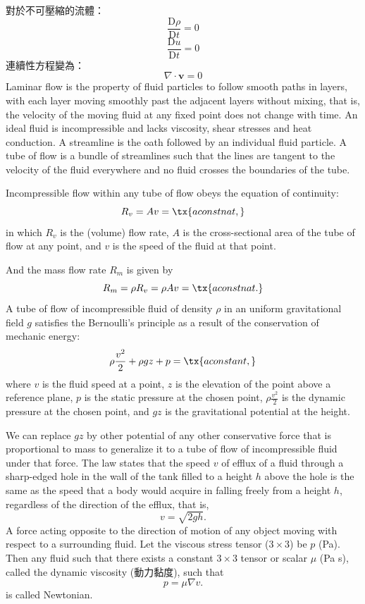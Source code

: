 \documentclass[a4paper,12pt]{article}
\begin{document}
對於不可壓縮的流體：
\[\frac{\mathrm{D}\rho}{\mathrm{D}t}=0\]
\[\frac{\mathrm{D}u}{\mathrm{D}t}=0\]
連續性方程變為：
\[\nabla\cdot\mathbf{v}=0\]
Laminar flow is the property of fluid particles to follow smooth paths in layers, with each layer moving smoothly past the adjacent layers without mixing, that is, the velocity of the moving fluid at any fixed point does not change with time.
An ideal fluid is incompressible and lacks viscosity, shear stresses and heat conduction.
A streamline is the oath followed by an individual fluid particle.
A tube of flow is a bundle of streamlines such that the lines are tangent to the velocity of the fluid everywhere and no fluid crosses the boundaries of the tube.

Incompressible flow within any tube of flow obeys the equation of continuity:
\[R_v=Av=\tx{a constnat,}\]
in which $R_v$ is the (volume) flow rate, $A$ is the cross-sectional area of the tube of flow at any point, and $v$ is the speed of the fluid at that point.

And the mass flow rate $R_m$ is given by
\[R_m=\rho R_v=\rho Av=\tx{a constnat.}\]
A tube of flow of incompressible fluid of density $\rho$ in an uniform gravitational field $g$ satisfies the Bernoulli's principle as a result of the conservation of mechanic energy:
\[\rho\frac{v^2}{2}+\rho gz+p=\tx{a constant,}\]
where $v$ is the fluid speed at a point, $z$ is the elevation of the point above a reference plane, $p$ is the static pressure at the chosen point, $\rho\frac{v^2}{2}$ is the dynamic pressure at the chosen point, and $gz$ is the gravitational potential at the height.

We can replace $gz$ by other potential of any other conservative force that is proportional to mass to generalize it to a tube of flow of incompressible fluid under that force.
The law states that the speed $v$ of efflux of a fluid through a sharp-edged hole in the wall of the tank filled to a height $h$ above the hole is the same as the speed that a body would acquire in falling freely from a height $h$, regardless of the direction of the efflux, that is,
\[v=\sqrt{2gh}.\]
A force acting opposite to the direction of motion of any object moving with respect to a surrounding fluid.
Let the viscous stress tensor ($3\times 3$) be $p$ (Pa). Then any fluid such that there exists a constant $3\times 3$ tensor or scalar $\mu$ (Pa s), called the dynamic viscosity (動力黏度), such that
\[p=\mu\nabla v.\]
is called Newtonian.
\end{document}
